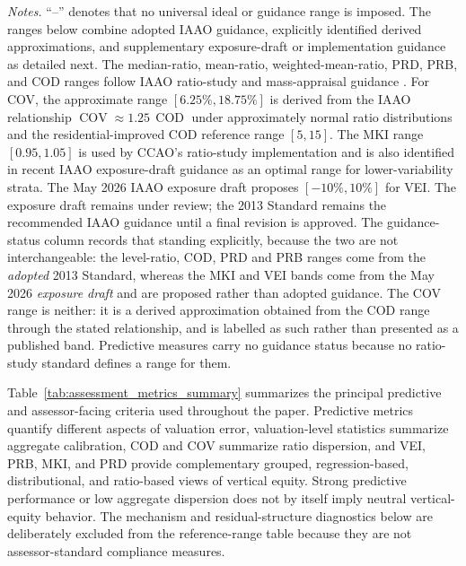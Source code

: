 \documentclass[10pt]{article}
\theoremstyle{definition}
\newcommand{\1}{\mathbf{1}}
\begin{document}
\begin{table}[!ht]
\vspace{1mm}
\begin{minipage}{\textwidth}
\scriptsize
\emph{Notes.}
``--'' denotes that no universal ideal or guidance range is imposed. The ranges below combine adopted IAAO guidance, explicitly identified derived approximations, and supplementary exposure-draft or implementation guidance as detailed next.
The median-ratio, mean-ratio, weighted-mean-ratio, PRD, PRB, and COD ranges
follow IAAO ratio-study and mass-appraisal guidance
\cite{IAAO2013Ratio,IAAO2018AVM,IAAO2025Mass}.
For COV, the approximate range $[6.25\%,18.75\%]$ is derived from the
IAAO relationship $\operatorname{COV}\approx1.25\,\operatorname{COD}$ under
approximately normal ratio distributions and the residential-improved COD
reference range $[5,15]$.
The MKI range $[0.95,1.05]$ is used by CCAO's ratio-study implementation
and is also identified in recent IAAO exposure-draft guidance as an
optimal range for lower-variability strata.
The May 2026 IAAO exposure draft proposes $[-10\%,10\%]$ for VEI.
The exposure draft remains under review; the 2013 Standard remains the
recommended IAAO guidance until a final revision is approved.
The guidance-status column records that standing explicitly, because
the two are not interchangeable: the level-ratio, COD, PRD and PRB ranges come
from the \emph{adopted} 2013 Standard, whereas the MKI and VEI bands come from
the May 2026 \emph{exposure draft} and are proposed rather than adopted
guidance. The COV range is neither: it is a derived approximation obtained from
the COD range through the stated relationship, and is labelled as such rather
than presented as a published band. Predictive measures carry no guidance status
because no ratio-study standard defines a range for them.
\end{minipage}

\end{table}


{Table~\ref{tab:assessment_metrics_summary} summarizes the principal predictive and assessor-facing criteria used throughout the paper. Predictive metrics quantify different aspects of valuation error, valuation-level statistics summarize aggregate calibration, COD and COV summarize ratio dispersion, and VEI, PRB, MKI, and PRD provide complementary grouped, regression-based, distributional, and ratio-based views of vertical equity. Strong predictive performance or low aggregate dispersion does not by itself imply neutral vertical-equity behavior.}
The mechanism and residual-structure diagnostics below are deliberately excluded from the reference-range table because they are not assessor-standard compliance measures.
\end{document}
